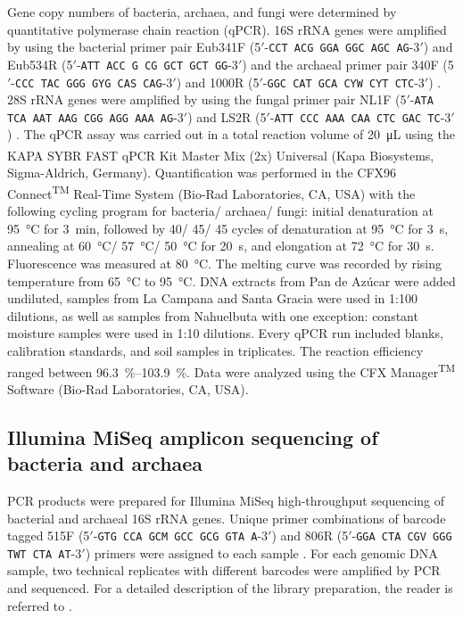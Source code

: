 Gene copy numbers of bacteria, archaea, and fungi were determined by quantitative polymerase chain reaction (qPCR). 16S rRNA genes were amplified by using the bacterial primer pair Eub341F (5\('\)-\texttt{CCT ACG GGA GGC AGC AG}-3\('\)) and Eub534R (5\('\)-\texttt{ATT ACC G CG GCT GCT GG}-3\('\)) \citep{Muyzer1993} and the archaeal primer pair 340F (5\('\)-\texttt{CCC TAC GGG GYG CAS CAG}-3\('\)) and 1000R (5\('\)-\texttt{GGC CAT GCA CYW CYT CTC}-3\('\)) \citep{Gantner2011}. 28S rRNA genes were amplified by using the fungal primer pair NL1F (5\('\)-\texttt{ATA TCA AAT AAG CGG AGG AAA AG}-3\('\)) and LS2R (5\('\)-\texttt{ATT CCC AAA CAA CTC GAC TC}-3\('\)) \citep{Bates2009}. The qPCR assay was carried out in a total reaction volume of \SI{20}{\micro\liter} using the KAPA SYBR\textsuperscript{\textregistered} FAST qPCR Kit Master Mix (2x) Universal (Kapa Biosystems, Sigma-Aldrich, Germany). Quantification was performed in the CFX96 Connect\textsuperscript{TM} Real-Time System (Bio-Rad Laboratories, CA, USA) with the following cycling program for bacteria/ archaea/ fungi: initial denaturation at \SI{95}{\degreeCelsius} for \SI{3}{\minute}, followed by 40/ 45/ 45 cycles of denaturation at \SI{95}{\degreeCelsius} for \SI{3}{\second}, annealing at \SI{60}{\degreeCelsius}/ \SI{57}{\degreeCelsius}/ \SI{50}{\degreeCelsius} for \SI{20}{\second}, and elongation at \SI{72}{\degreeCelsius} for \SI{30}{\second}. Fluorescence was measured at \SI{80}{\degreeCelsius}. The melting curve was recorded by rising temperature from \SI{65}{\degreeCelsius} to \SI{95}{\degreeCelsius}. DNA extracts from Pan de Az{\'u}car were added undiluted, samples from La Campana and Santa Gracia were used in 1:100 dilutions, as well as samples from Nahuelbuta with one exception: constant moisture samples were used in 1:10 dilutions. Every qPCR run included blanks, calibration standards, and soil samples in triplicates. The reaction efficiency ranged between \SIrange{96.3}{103.9}{\percent}. Data were analyzed using the CFX Manager\textsuperscript{TM} Software (Bio-Rad Laboratories, CA, USA).

\subsection{Illumina MiSeq amplicon sequencing of bacteria and archaea}

PCR products were prepared for Illumina MiSeq high-throughput sequencing of bacterial and archaeal 16S rRNA genes. Unique primer combinations of barcode tagged 515F (5\('\)-\texttt{GTG CCA GCM GCC GCG GTA A}-3\('\)) and 806R (5\('\)-\texttt{GGA CTA CGV GGG TWT CTA AT}-3\('\)) primers were assigned to each sample \citep{Caporaso2012}. For each genomic DNA sample, two technical replicates with different barcodes were amplified by PCR and sequenced. For a detailed description of the library preparation, the reader is referred to \citet{Moskwa2020}.


